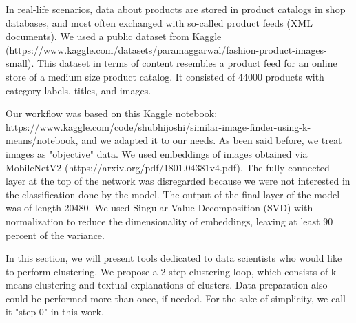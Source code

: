 \documentclass[
 twocolumn,
]{ceurart}
\begin{document}
In real-life scenarios, data about products are stored in product catalogs in shop databases, and most often exchanged with so-called product feeds (XML documents).
We used a public dataset from Kaggle (https://www.kaggle.com/datasets/paramaggarwal/fashion-product-images-small).
This dataset in terms of content resembles a product feed for an online store of a medium size product catalog.
It consisted of 44000 products with category labels, titles, and images.

Our workflow was based on this Kaggle notebook: https://www.kaggle.com/code/shubhijoshi/similar-image-finder-using-k-means/notebook, and we adapted it to our needs.
As been said before, we treat images as "objective" data.
We used embeddings of images obtained via MobileNetV2 (https://arxiv.org/pdf/1801.04381v4.pdf).
The fully-connected layer at the top of the network was disregarded because we were not interested in the classification done by the model.
The output of the final layer of the model was of length 20480.
We used Singular Value Decomposition (SVD) with normalization to reduce the dimensionality of embeddings, leaving at least 90 percent of the variance.

In this section, we will present tools dedicated to data scientists who would like to perform clustering.
We propose a 2-step clustering loop, which consists of k-means clustering and textual explanations of clusters.
Data preparation also could be performed more than once, if needed.
For the sake of simplicity, we call it "step 0" in this work.
\end{document}
